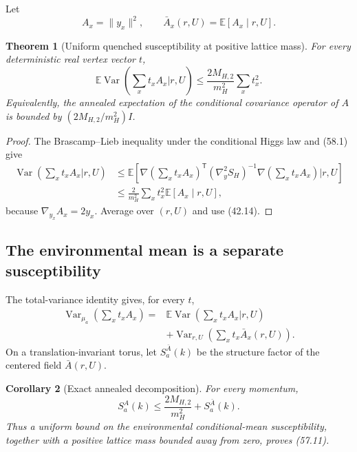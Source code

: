 \documentclass[11pt]{article}
\newtheorem{theorem}{Theorem}[section]
\newtheorem{corollary}[theorem]{Corollary}
\theoremstyle{remark}
\begin{document}
Let
\[
 A_x=\|y_x\|^2,\qquad
 \bar A_x(r,U)=\mathbb E[A_x\mid r,U].             \tag{58.2}
\]

\begin{theorem}[Uniform quenched susceptibility at positive lattice
mass]
\label{thm:v17v58-quenched}
For every deterministic real vertex vector \(t\),
\[
\boxed{
 \mathbb E\operatorname{Var}
 \left(\sum_xt_xA_x\mathrel{\big|}r,U\right)
 \leq
 \frac{2M_{H,2}}{m_H^2}\sum_xt_x^2.}              \tag{58.3}
\]
Equivalently, the annealed expectation of the conditional covariance
operator of \(A\) is bounded by
\((2M_{H,2}/m_H^2)I\).
\end{theorem}

\begin{proof}
The Brascamp--Lieb inequality under the conditional Higgs law and
(58.1) give
\[
\begin{aligned}
 \operatorname{Var}
 \left(\sum_xt_xA_x\mathrel{\big|}r,U\right)
 &\leq
 \mathbb E\left[
 \nabla\left(\sum_xt_xA_x\right)^{\mathsf T}
 (\nabla_y^2S_H)^{-1}
 \nabla\left(\sum_xt_xA_x\right)
 \mathrel{\big|}r,U\right]\\
 &\leq
 \frac{2}{m_H^2}
 \sum_xt_x^2\mathbb E[A_x\mid r,U],               \tag{58.4}
\end{aligned}
\]
because \(\nabla_{y_x}A_x=2y_x\).
Average over \((r,U)\) and use (42.14).
\end{proof}

\subsection{The environmental mean is a separate susceptibility}

The total-variance identity gives, for every \(t\),
\[
\begin{aligned}
 \operatorname{Var}_{\mu_a}\left(\sum_xt_xA_x\right)
 ={}&
 \mathbb E\operatorname{Var}
 \left(\sum_xt_xA_x\mathrel{\big|}r,U\right)\\
 &+
 \operatorname{Var}_{r,U}
 \left(\sum_xt_x\bar A_x(r,U)\right).             \tag{58.5}
\end{aligned}
\]
On a translation-invariant torus, let
\(S_a^{\bar A}(k)\) be the structure factor of the centered field
\(\bar A(r,U)\).

\begin{corollary}[Exact annealed decomposition]
\label{cor:v17v58-decomposition}
For every momentum,
\[
\boxed{
 S_a^A(k)
 \leq
 \frac{2M_{H,2}}{m_H^2}
 +S_a^{\bar A}(k).}                               \tag{58.6}
\]
Thus a uniform bound on the environmental conditional-mean
susceptibility, together with a positive lattice mass bounded away
from zero, proves (57.11).
\end{corollary}
\end{document}
